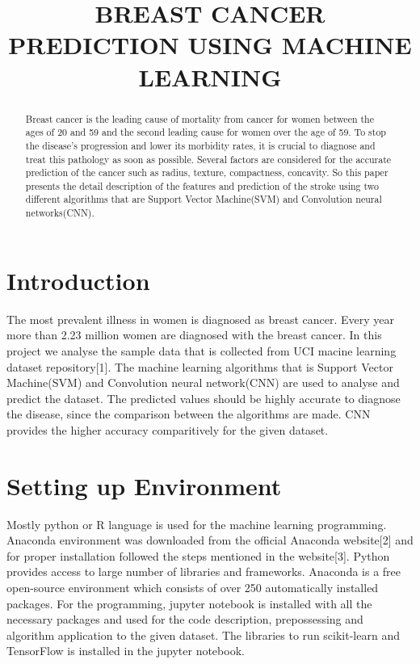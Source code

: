 \documentclass[conference]{IEEEtran}
\begin{document}
\lstset{
breaklines=True
}
\title{BREAST CANCER PREDICTION USING MACHINE LEARNING}

\author{
}

\maketitle

\begin{abstract}
Breast cancer is the leading cause of mortality from cancer for women between the ages of 20 and 59 and the second leading cause for women over the age of 59. To stop the disease's progression and lower its morbidity rates, it is crucial to diagnose and treat this pathology as soon as possible. Several factors are considered for the accurate prediction of the cancer such as radius, texture, compactness, concavity. So this paper presents the detail description of the features and prediction of the stroke using two different algorithms that are Support Vector Machine(SVM) and Convolution neural networks(CNN).
\end{abstract}

\section{Introduction}
The most prevalent illness in women is diagnosed as breast cancer. Every year more than 2.23 million women are diagnosed with the breast cancer.  In this project we analyse the sample data that is collected from UCI macine learning dataset repository[1]. The machine learning algorithms that is Support Vector Machine(SVM) and Convolution neural network(CNN) are  used to analyse and predict the dataset. The predicted values should be highly accurate to diagnose the disease, since the comparison between the algorithms are made. CNN provides the higher accuracy comparitively for the given dataset.   
\section{Setting up Environment}
Mostly python or R language is used for the machine learning programming. Anaconda environment was downloaded from the official Anaconda website[2] and for proper installation followed the steps mentioned in the website[3]. Python provides access to large number of libraries and frameworks. Anaconda is a free open-source environment which consists of over 250 automatically installed packages.
For the programming, jupyter notebook is installed with all the necessary packages and used for the code description, prepossessing and algorithm application to the given dataset. The libraries to run scikit-learn and TensorFlow is installed in the jupyter notebook.
\end{document}
